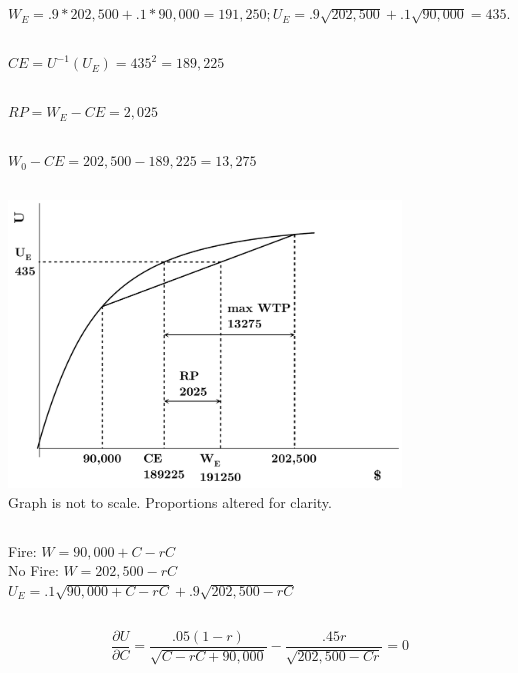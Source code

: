 \documentclass{article}
\begin{document}
\section[4]{}
	\subsection[a]{}
		$W_E = .9*202,500+.1*90,000=191,250; U_E =.9\sqrt{202,500}+.1\sqrt{90,000}=435.$
	\subsection[b]{}
		$CE = U^{-1}(U_E) = 435^2 = 189,225$
	\subsection[c]{}
		$RP = W_E - CE = 2,025$
	\subsection[d]{}
		$ W_0-CE = 202,500 - 189,225 = 13,275	$
	\subsection[e]{}
		\includegraphics[height=3in]{Charts/4e}
		 \\Graph is not to scale. Proportions altered for clarity. 
	\subsection[f]{}
		Fire: $W = 90,000+C-rC$	\\
		No Fire: $ W = 202,500 - rC $ \\
		$ U_E = .1 \sqrt{90,000+C-rC} + .9 \sqrt{202,500 - rC} $
	\subsection[g]{}
		$$
			\frac{\partial U}{\partial C} = \frac{.05(1-r)}{\sqrt{C-rC+90,000}} - \frac{.45r}{\sqrt{202,500-Cr}} = 0
		$$
\end{document}
